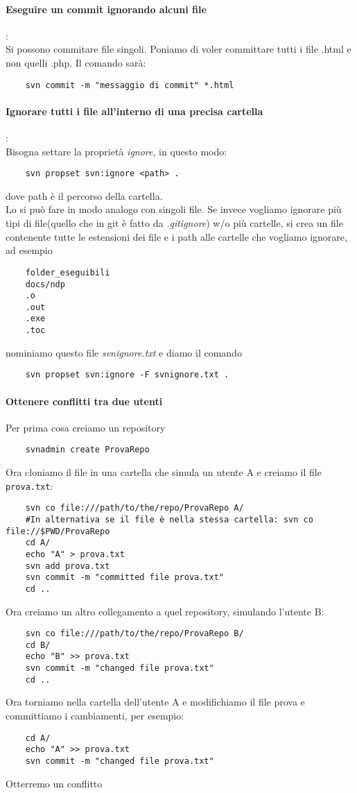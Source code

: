 \documentclass[a4paper]{article}
\begin{document}
	\paragraph{Eseguire un commit ignorando alcuni file}: \\
	Si possono commitare file singoli. Poniamo di voler committare tutti i file .html e non quelli .php. Il comando sarà:
	\begin{verbatim}
	svn commit -m "messaggio di commit" *.html
	\end{verbatim}
	\paragraph{Ignorare tutti i file all'interno di una precisa cartella}: \\
	\label{svn:ignorare:tutti}
	Bisogna settare la proprietà \textit{ignore}, in questo modo:
	\begin{verbatim}
	svn propset svn:ignore <path> .
	\end{verbatim}
	dove path è il percorso della cartella.\\
	Lo si può fare in modo analogo con singoli file.
	Se invece vogliamo ignorare più tipi di file(quello che in git è fatto da \textit{.gitignore}) w/o più cartelle, si crea un file contenente tutte le estensioni dei file e i path alle cartelle che vogliamo ignorare, ad esempio
	\begin{verbatim}
	folder_eseguibili
	docs/ndp
	.o 
	.out
	.exe
	.toc 
	\end{verbatim}
	nominiamo questo file \textit{svnignore.txt} e diamo il comando
	\begin{verbatim}
	svn propset svn:ignore -F svnignore.txt .
	\end{verbatim}

	\paragraph{Ottenere conflitti tra due utenti}
	Per prima cosa creiamo un repository
	\begin{verbatim}
	svnadmin create ProvaRepo
	\end{verbatim}
	Ora cloniamo il file in una cartella che simula un utente A e creiamo
	il file \verb|prova.txt|:
	\begin{verbatim}
	svn co file:///path/to/the/repo/ProvaRepo A/
	#In alternativa se il file è nella stessa cartella: svn co file://$PWD/ProvaRepo 
	cd A/
	echo "A" > prova.txt 
	svn add prova.txt
	svn commit -m "committed file prova.txt"
	cd ..
	\end{verbatim}
	Ora creiamo un altro collegamento a quel repository, simulando l'utente B:
	\begin{verbatim}
	svn co file:///path/to/the/repo/ProvaRepo B/
	cd B/
	echo "B" >> prova.txt
	svn commit -m "changed file prova.txt"
	cd ..
	\end{verbatim}
	Ora torniamo nella cartella dell'utente A e modifichiamo il file prova e 
	committiamo i cambiamenti, per esempio:
	\begin{verbatim}
	cd A/
	echo "A" >> prova.txt
	svn commit -m "changed file prova.txt"
	\end{verbatim}
	Otterremo un conflitto
\end{document}
